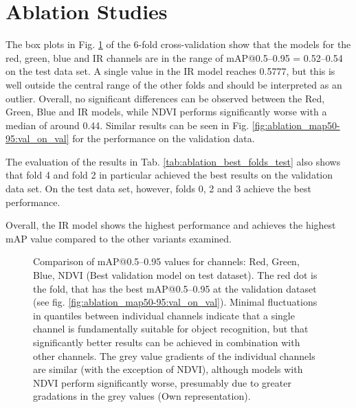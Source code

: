 \section{Ablation Studies}

The box plots in Fig. \ref{fig:ablation_map50-95:val_on_test} of the 6-fold cross-validation show that the models for the red, green, blue and IR channels are in the range of \acrshort{mAP}@0.5--0.95 = 0.52–0.54 on the test data set. A single value in the IR model reaches 0.5777, but this is well outside the central range of the other folds and should be interpreted as an outlier. Overall, no significant differences can be observed between the Red, Green, Blue and IR models, while NDVI performs significantly worse with a median of around 0.44. Similar results can be seen in Fig. \ref{fig:ablation_map50-95:val_on_val} for the performance on the validation data.

The evaluation of the results in Tab. \ref{tab:ablation_best_folds_test} also shows that fold 4 and fold 2 in particular achieved the best results on the validation data set. On the test data set, however, folds 0, 2 and 3 achieve the best performance.  

Overall, the IR model shows the highest performance and achieves the highest \acrshort{mAP} value compared to the other variants examined.




\begin{figure}[htbp]
    \centering
    
    \caption[Comparison of \acrshort{mAP}@0.5--0.95 values for channels: red, green, blue, ndvi (Best validation model on test dataset)]{Comparison of \acrshort{mAP}@0.5--0.95 values for channels: Red, Green, Blue, NDVI (Best validation model on test dataset). The red dot is the fold, that has the best \acrshort{mAP}@0.5--0.95 at the validation dataset (see fig. \ref{fig:ablation_map50-95:val_on_val}). Minimal fluctuations in quantiles between individual channels indicate that a single channel is fundamentally suitable for object recognition, but that significantly better results can be achieved in combination with other channels. The grey value gradients of the individual channels are similar (with the exception of NDVI), although models with NDVI perform significantly worse, presumably due to greater gradations in the grey values (Own representation).}
    \label{fig:ablation_map50-95:val_on_test}
\end{figure}


